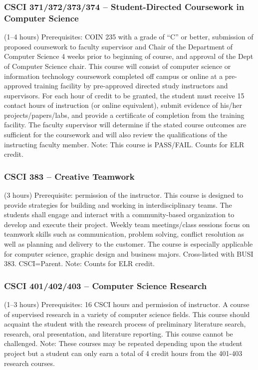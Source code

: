 \subsubsection{CSCI 371/372/373/374 -- Student-Directed Coursework in Computer Science} %
(1--4 hours) Prerequisites: COIN 235 with a grade of “C” or better, submission of proposed coursework to faculty supervisor and Chair of the Department of Computer Science 4 weeks prior to beginning of course, and approval of the Dept of Computer Science chair. This course will consist of computer science or information technology coursework completed off campus or online at a pre-approved training facility by pre-approved directed study instructors and supervisors. For each hour of credit to be granted, the student must receive 15 contact hours of instruction (or online equivalent), submit evidence of his/her projects/papers/labs, and provide a certificate of completion from the training facility. The faculty supervisor will determine if the stated course outcomes are sufficient for the coursework and will also review the qualifications of the instructing faculty member.  Note: This course is PASS/FAIL. Counts for ELR credit.

\subsubsection{CSCI 383 -- Creative Teamwork}%
\label{course:CSCI:383}
(3 hours) Prerequisite: permission of the instructor. This course is designed to provide strategies for building and working in interdisciplinary teams. The students shall engage and interact with a community-based organization to develop and execute their project. Weekly team meetings/class sessions focus on teamwork skills such as communication, problem solving, conflict resolution as well as planning and delivery to the customer. The course is especially applicable for computer science, graphic design and business majors. Cross-listed with BUSI 383. CSCI=Parent. Note: Counts for ELR credit.

\subsubsection{CSCI 401/402/403 -- Computer Science Research} %
(1--3 hours) Prerequisites: 16 CSCI hours and permission of instructor. A course of supervised research in a variety of computer science fields. This course should acquaint the student with the research process of preliminary literature search, research, oral presentation, and literature reporting. This course cannot be challenged. Note: These courses may be repeated depending upon the student project but a student can only earn a total of 4 credit hours from the 401-403 research courses.

